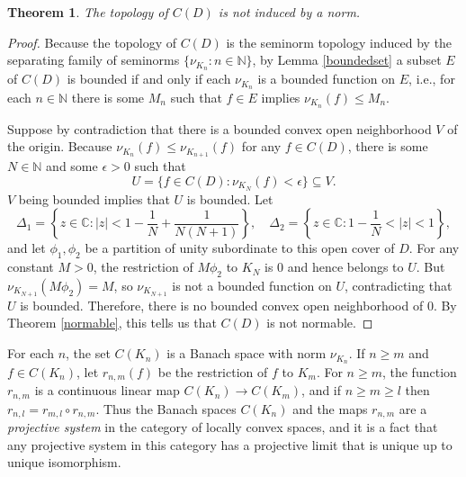 \documentclass{article}
\newtheorem{theorem}{Theorem}
\begin{document}
\begin{theorem}
The topology of $C(D)$  is not induced by a  norm.
\end{theorem}
\begin{proof}
Because the topology of $C(D)$ is the seminorm topology induced by the separating family of seminorms $\{\nu_{K_n}: n \in \mathbb{N}\}$,
by Lemma \ref{boundedset} a subset $E$ of $C(D)$ is bounded if and only if each $\nu_{K_n}$ is a bounded function
on $E$, i.e., for each $n \in \mathbb{N}$ there is some $M_n$ such that $f \in E$ implies $\nu_{K_n}(f) \leq M_n$.

Suppose by contradiction that there is a  bounded convex open neighborhood $V$ of the origin. Because $\nu_{K_n}(f) \leq \nu_{K_{n+1}}(f)$ for any $f \in C(D)$, there is
some $N \in \mathbb{N}$ and some $\epsilon>0$ such that
\[
U=\{f \in C(D): \nu_{K_N}(f)<\epsilon\} \subseteq V.
\]
$V$ being bounded implies that $U$ is bounded. Let 
\[
\Delta_1 = \left\{z \in \mathbb{C}: |z|<1-\frac{1}{N}+\frac{1}{N(N+1)} \right\}, \quad \Delta_2 = \left\{z \in \mathbb{C}: 1-\frac{1}{N} < |z| < 1 \right\},
\]
and let $\phi_1,\phi_2$ be a partition of unity subordinate to this open cover of $D$. For any constant $M>0$, the restriction of $M\phi_2$ to $K_N$ is $0$ and
hence  belongs to $U$. But $\nu_{K_{N+1}}(M\phi_2)=M$, so $\nu_{K_{N+1}}$ is not a bounded function on $U$, contradicting that $U$ is bounded. Therefore, there is no bounded convex
open neighborhood of $0$. 
By Theorem \ref{normable},  this tells us that $C(D)$ is not normable.
\end{proof}



For each $n$, the set $C(K_n)$ is a Banach space with norm $\nu_{K_n}$. 
If $n \geq m$ and $f \in C(K_n)$, let $r_{n,m}(f)$ be the restriction of $f$ 
to $K_m$. For $n \geq m$, the function $r_{n,m}$ is a continuous linear map $C(K_n) \to C(K_m)$, and  if $n \geq m \geq l$ then $r_{n,l} = r_{m,l} \circ r_{n,m}$. Thus the Banach spaces $C(K_n)$ and the maps
$r_{n,m}$ are a {\em projective system} in the category of locally convex spaces, and it is a fact that any projective system in this category has a projective limit  that is unique up to unique isomorphism. 
\end{document}
